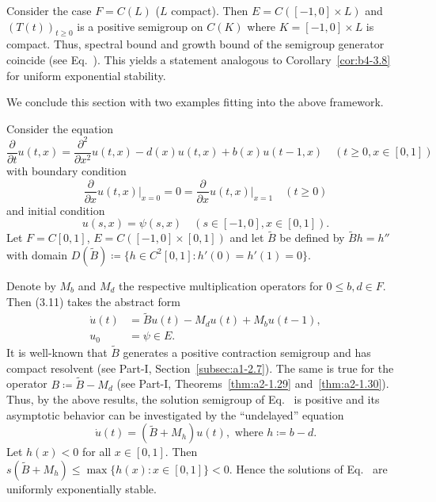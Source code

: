 \begin{remark*}
	Consider the case $F = C(L)$ ($L$ compact).
	Then $E = C([-1,0] \times L)$ and $(T(t))_{t\geq0}$ is a positive semigroup on $C(K)$ where $K = [-1,0] \times L$ is compact. 
	Thus, spectral bound and growth bound of the semigroup generator coincide (see Eq.~). 
	This yields a statement analogous to Corollary~\ref{cor:b4-3.8} for uniform exponential stability.
\end{remark*}
We conclude this section with two examples fitting into the above framework.

\begin{example}\label{ex:b4-3.11}
	Consider the equation
\[
    \frac{\partial}{\partial t}u(t,x) = 
    \frac{\partial^2}{\partial x^2}u(t,x) - d(x)u(t,x) + b(x)u(t-1,x) \quad (t\geq0,x\in[0,1])
\]
with boundary condition
\begin{equation}\label{eq:b4-3.11}
    \frac{\partial}{\partial x}u(t,x)\big|_{x=0} = 0 = \frac{\partial}{\partial x}u(t,x)\big|_{x=1} \quad (t\geq0)
\end{equation}
and initial condition
\[
	u(s,x) = \psi(s,x) \quad (s\in[-1,0],x\in[0,1]) .
\]
Let $F = C[0,1]$, $E = C([-1,0]\times[0,1])$ and let $\tilde{B}$ be defined by $\tilde{B}h = h''$ with domain $D(\tilde{B}) \coloneq  \{h \in C^2[0,1] \colon h'(0) = h'(1) = 0\}$.

Denote by $M_b$ and $M_d$ the respective multiplication operators for $0 \leq b,d \in F$. 
Then (3.11) takes the abstract form
\begin{align*}
	\dot{u}(t) &= \tilde{B}u(t) - M_du(t) + M_bu(t-1) ,\\
	u_0 &= \psi \in E .
\end{align*}
It is well-known that $\tilde{B}$ generates a positive contraction semigroup and has compact resolvent (see Part-I, Section~\ref{subsec:a1-2.7}). 
The same is true for the operator $B  \coloneq  \tilde{B} - M_d$ (see Part-I, Theorems~\ref{thm:a2-1.29} and~\ref{thm:a2-1.30}). 
Thus, by the above results, the solution semigroup of Eq.~ is positive and its asymptotic behavior can be investigated by the \enquote{undelayed} equation
\[
\dot{u}(t) = (\tilde{B} + M_h)u(t) , \text{ where } h \coloneq  b - d .
\]
Let $h(x) < 0$ for all $x \in [0,1]$.
Then $s(\tilde{B} + M_h) \leq \max\{h(x) \colon x \in [0,1]\} < 0$. 
Hence the solutions of Eq.~ are uniformly exponentially stable.
\end{example}

